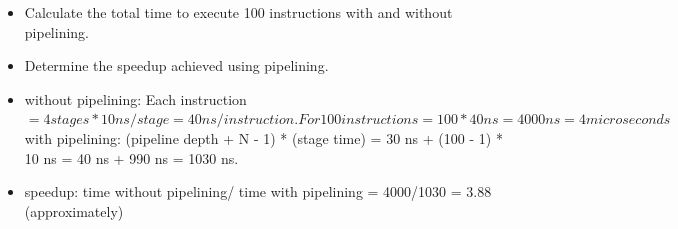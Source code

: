\documentclass[10pt,answers]{exam}
\begin{document}
\begin{questions}
\begin{itemize}
    \item Calculate the total time to execute 100 instructions with and without pipelining.
    \item Determine the speedup achieved using pipelining.
\end{itemize}

\begin{solution}
    \begin{itemize}
		\item without pipelining: Each instruction $= 4 stages * 10 ns/stage = 40 ns/instruction. For 100 instructions = 100*40 ns = 4000 ns = 4 microseconds$ \\
		with pipelining: (pipeline depth + N - 1) * (stage time) = 30 ns + (100 - 1) * 10 ns = 40 ns + 990 ns = 1030 ns.
		\item speedup: time without pipelining/ time with pipelining = 4000/1030 = 3.88 (approximately)
	\end{itemize}
\end{solution}



\end{questions}
\end{document}
